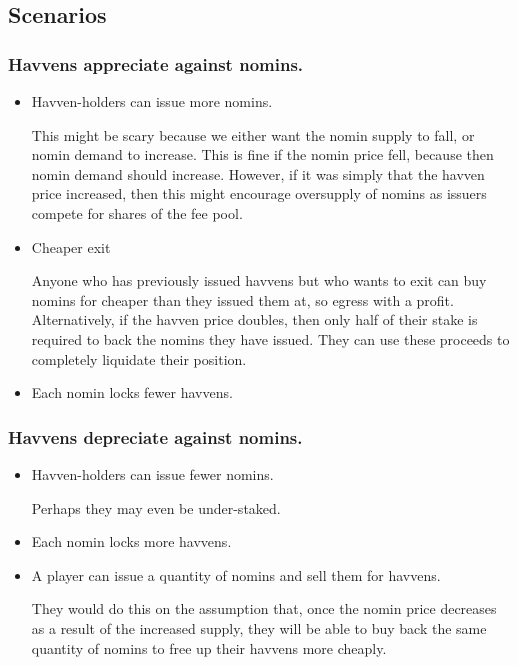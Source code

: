 \subsection{Scenarios}

\subsubsection{Havvens appreciate against nomins.} \label{sec:havven-nomin-appreciation}
\begin{itemize}
	\item{Havven-holders can issue more nomins.}

	This might be scary because we either want the nomin supply to fall, or nomin demand to increase.
	This is fine if the nomin price fell, because then nomin demand should increase.
	However, if it was simply that the havven price increased, then this might encourage
	oversupply of nomins as issuers compete for shares of the fee pool.

	\item{Cheaper exit}

	Anyone who has previously issued havvens but who wants to exit can buy nomins for
	cheaper than they issued them at, so egress with a profit.
	Alternatively, if the havven price doubles, then only half of their stake is required
	to back the nomins they have issued. They can use these proceeds to completely liquidate
	their position.

	\item{Each nomin locks fewer havvens.}
	
\end{itemize}

\subsubsection{Havvens depreciate against nomins.} \label{sec:havven-nomin-depreciation}

\begin{itemize}
	\item{Havven-holders can issue fewer nomins.}
	
	Perhaps they may even be under-staked.

	\item{Each nomin locks more havvens.}
	\item{A player can issue a quantity of nomins and sell them for havvens.}
		  
	They would do this on the assumption that, once the nomin price decreases as a result of the increased
	supply, they will be able to buy back the same quantity of nomins to free up their
	havvens more cheaply.
\end{itemize}


